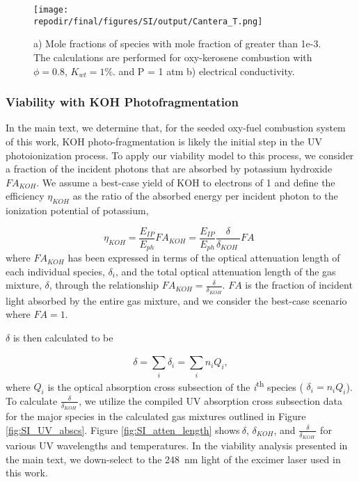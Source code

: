 \begin{figure}[ht]
    \centering
    \texttt{[image: \\repodir/final/figures/SI/output/Cantera\_T.png]}
    \caption{a) Mole fractions of species with mole fraction of greater than 1e-3. The calculations are performed for oxy-kerosene combustion with \(\phi = 0.8\), \(K_{wt} = 1\%\). and P = 1 atm b)  electrical conductivity.}
    \label{fig:SI_Cantera_T}
\end{figure} 


\hypertarget{photoionization}{%
\subsubsection{Viability with KOH Photofragmentation}\label{photoionization}}

In the main text, we determine that, for the seeded oxy-fuel combustion system of this work, KOH photo-fragmentation is likely the initial step in the UV photoionization process. To apply our viability model to this process, we consider a fraction of the incident photons that are absorbed by potassium hydroxide \(FA_{KOH}\). We assume a best-case yield of KOH to electrons of 1 and define the efficiency $\eta_{KOH}$ as the ratio of the absorbed energy per incident photon to the ionization potential of potassium,

\begin{equation}
\eta_{KOH} = \frac{E_{IP}}{E_{ph}}FA_{KOH} = \frac{E_{IP}}{E_{ph}}\frac{\delta}{\delta_{KOH}\ }FA\ \,
\end{equation}
where \(FA_{KOH}\) has been expressed in terms of the optical attenuation length of each individual species, \(\delta_{i}\), and the total optical attenuation length of the gas mixture, \(\delta\), through the relationship $FA_{KOH} = \frac{\delta}{\delta_{KOH}}$. $FA$ is the fraction of incident light absorbed by the entire gas mixture, and we consider the best-case scenario where $FA = 1$. 

\(\delta\) is then calculated to be

\begin{equation}
\delta = \sum_{i}^{}\delta_{i} = \sum_{i}^{}{n_{i}Q_{i}},
\end{equation}
where \(Q_{i}\) is the optical absorption cross subsection of the \emph{i}\textsuperscript{th} species ( \(\delta_{i} = n_{i}Q_{i}\)). To calculate \(\frac{\delta}{\delta_{KOH}\ }\), we utilize the compiled UV absorption cross subsection data for the major species in the calculated gas mixtures outlined in Figure \ref{fig:SI_UV_abscs}. Figure \ref{fig:SI_atten_length} shows\(\ \delta\), \(\delta_{KOH}\), and \(\frac{\delta}{\delta_{KOH}\ }\) for various UV wavelengths and temperatures. In the viability analysis presented in the main text, we down-select to the \SI{248}{\nano\meter} light of the excimer laser used in this work.

